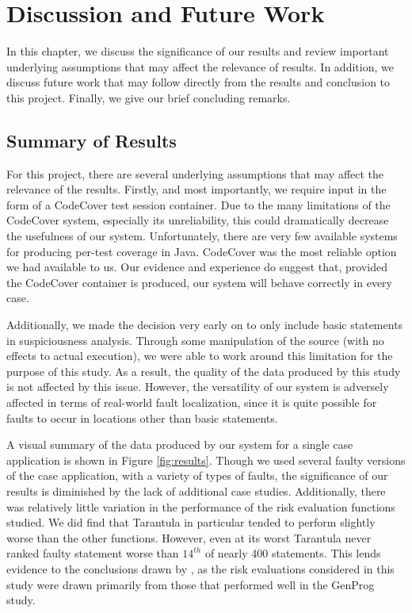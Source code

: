%
%
%

\chapter{Discussion and Future Work}\label{ch:conclusion}

In this chapter, we discuss the significance of our results and review
important underlying assumptions that may affect the relevance of results.
In addition, we discuss future work that may follow directly from the 
results and conclusion to this project.  Finally, we give our brief
concluding remarks.

\section{Summary of Results}\label{sec:summ}

For this project, there are several underlying assumptions that may affect
the relevance of the results.  Firstly, and most importantly, we require
input in the form of a CodeCover test session container.  Due to the many
limitations of the CodeCover system, especially its unreliability, this 
could dramatically decrease the usefulness of our system.  Unfortunately,
there are very few available systems for producing per-test coverage in
Java.  CodeCover was the most reliable option we had available to us.  Our
evidence and experience do suggest that, provided the CodeCover container
is produced, our system will behave correctly in every case.

Additionally, we made the decision very early on to only include basic
statements in suspiciousness analysis.  Through some manipulation of the
source (with no effects to actual execution), we were able to work around
this limitation for the purpose of this study.  As a result, the quality
of the data produced by this study is not affected by this issue.  However,
the versatility of our system is adversely affected in terms of real-world
fault localization, since it is quite possible for faults to occur in
locations other than basic statements.  

A visual summary of the data produced by our
system for a single case application is shown in Figure \ref{fig:results}.  Though we used several faulty
versions of the case application, with a variety of types of faults, the
significance of our results is diminished by the lack of additional case
studies.  Additionally, there was relatively little variation in the performance
of the risk evaluation functions studied.  We did find that Tarantula in
particular tended to perform slightly worse than the other functions.  However,
even at its worst Tarantula never ranked faulty statement worse than $14^{th}$ of
nearly 400 statements.  This lends evidence to the conclusions drawn by \cite{genprog},
as the risk evaluations considered in this study were drawn primarily from those
that performed well in the GenProg study.

